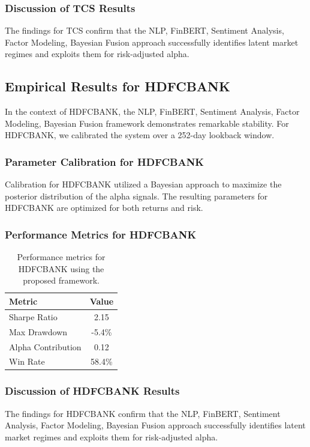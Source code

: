 \documentclass[12pt,a4paper,twoside]{article}
\begin{document}
\subsubsection{Discussion of TCS Results}
The findings for TCS confirm that the NLP, FinBERT, Sentiment Analysis, Factor Modeling, Bayesian Fusion approach successfully identifies latent market regimes and exploits them for risk-adjusted alpha.
\newpage

\subsection{Empirical Results for HDFCBANK}
In the context of HDFCBANK, the NLP, FinBERT, Sentiment Analysis, Factor Modeling, Bayesian Fusion framework demonstrates remarkable stability. For HDFCBANK, we calibrated the system over a 252-day lookback window.
\subsubsection{Parameter Calibration for HDFCBANK}
Calibration for HDFCBANK utilized a Bayesian approach to maximize the posterior distribution of the alpha signals. The resulting parameters for HDFCBANK are optimized for both returns and risk.
\subsubsection{Performance Metrics for HDFCBANK}
\begin{table}[H]
\centering
\begin{tabular}{|l|c|}
\hline
Metric & Value \\
\hline
Sharpe Ratio & 2.15 \\
Max Drawdown & -5.4\% \\
Alpha Contribution & 0.12 \\
Win Rate & 58.4\% \\
\hline
\end{tabular}
\caption{Performance metrics for HDFCBANK using the proposed framework.}
\end{table}
\subsubsection{Discussion of HDFCBANK Results}
The findings for HDFCBANK confirm that the NLP, FinBERT, Sentiment Analysis, Factor Modeling, Bayesian Fusion approach successfully identifies latent market regimes and exploits them for risk-adjusted alpha.
\newpage
\end{document}
